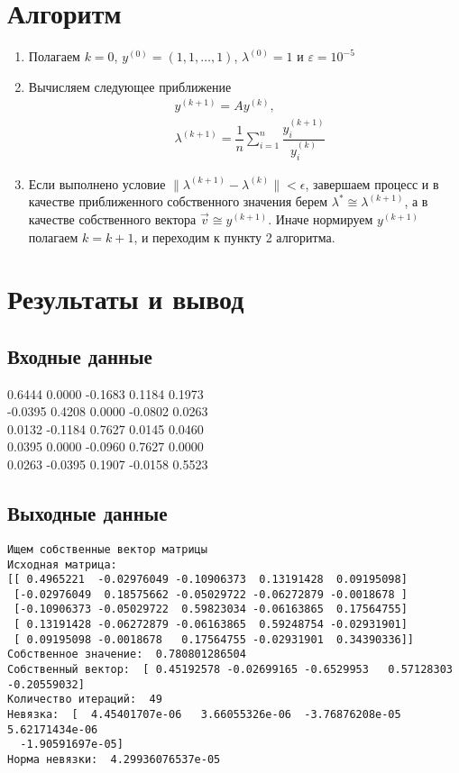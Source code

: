 \documentclass[11.4pt]{article}
\begin{document}
\section{Алгоритм}
	\begin{enumerate}
		\item Полагаем $k=0$, $y^{(0)}=(1, 1, \ldots, 1)$, $\lambda^{(0)} = 1$ и $\varepsilon = 10^{-5}$
		\item Вычисляем следующее приближение 
		\begin{equation*}
			\begin{aligned}
				&y^{(k+1)} =Ay^{(k)},\\
				&\lambda^{(k+1)} = \dfrac{1}{n}\sum\limits_{i=1}^{n}\dfrac{y^{(k+1)}_i}{y^{(k)}_i}
			\end{aligned}
		\end{equation*}
		\item Если выполнено условие $\|\lambda^{(k+1)}-\lambda^{(k)}\|<\epsilon$, завершаем процесс  и в качестве приближенного собственного значения берем $\lambda^{\ast} \cong \lambda^{(k+1)}$, а в качестве собственного вектора $\vec{v} \cong y^{(k+1)}$. Иначе нормируем $y^{(k+1)}$ полагаем $k=k+1$, и переходим к пункту 2 алгоритма.
	\end{enumerate}
\section{Результаты и вывод}
	\subsection{Входные данные}
		0.6444 0.0000 -0.1683 0.1184 0.1973\\
		-0.0395 0.4208 0.0000 -0.0802 0.0263\\
		0.0132 -0.1184 0.7627 0.0145 0.0460\\
		0.0395 0.0000 -0.0960 0.7627 0.0000\\
		0.0263 -0.0395 0.1907 -0.0158 0.5523\\
	\subsection{Выходные данные}
\begin{verbatim}
Ищем собственные вектор матрицы
Исходная матрица:
[[ 0.4965221  -0.02976049 -0.10906373  0.13191428  0.09195098]
 [-0.02976049  0.18575662 -0.05029722 -0.06272879 -0.0018678 ]
 [-0.10906373 -0.05029722  0.59823034 -0.06163865  0.17564755]
 [ 0.13191428 -0.06272879 -0.06163865  0.59248754 -0.02931901]
 [ 0.09195098 -0.0018678   0.17564755 -0.02931901  0.34390336]]
Собственное значение:  0.780801286504
Собственный вектор:  [ 0.45192578 -0.02699165 -0.6529953   0.57128303 -0.20559032]
Количество итераций:  49
Невязка:  [  4.45401707e-06   3.66055326e-06  -3.76876208e-05   5.62171434e-06
  -1.90591697e-05]
Норма невязки:  4.29936076537e-05
 \end{verbatim}
\end{document}
